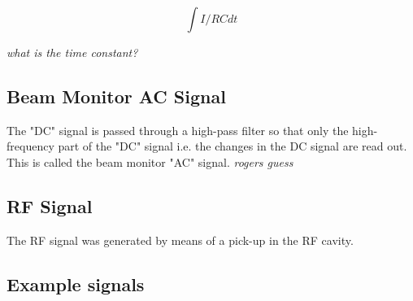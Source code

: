 \documentclass{paper}
\begin{document}
\begin{equation}
\int I/RC dt
\end{equation}

\emph{what is the time constant?}

\subsection{Beam Monitor AC Signal}
The "DC" signal is passed through a high-pass filter so that only the high-
frequency part of the "DC" signal i.e. the changes in the DC signal are read 
out. This is called the beam monitor "AC" signal. \emph{rogers guess}

\subsection{RF Signal}
The RF signal was generated by means of a pick-up in the RF cavity.

\subsection{Example signals}
\end{document}
